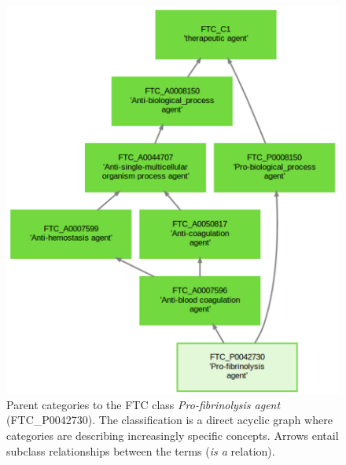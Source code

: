\documentclass{bioinfo}
\begin{document}
\begin{figure}[!tpb]%
\centerline{\includegraphics{fig2.png}}
\caption{Parent categories to the FTC class \emph{Pro-fibrinolysis agent} (FTC\_P0042730). The classification is a direct 
acyclic graph where categories are describing increasingly specific concepts. Arrows entail subclass relationships 
between the terms (\emph{is a} relation).}\label{fig:02}
\end{figure}
\end{document}
